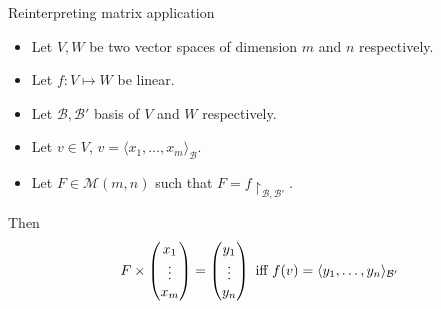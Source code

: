 \documentclass{beamer}
\begin{document}
\begin{frame}{Reinterpreting matrix application}
  \begin{itemize}
  \item Let $V, W$ be two vector spaces of dimension $m$ and $n$ respectively.
  \item Let $f: V \mapsto W$ be linear.
  \item Let $\mathcal{B}, \mathcal{B}'$ basis of $V$ and $W$ respectively.
  \item Let $v \in V$, $v = \langle x_1, \dots, x_m \rangle_{\mathcal{B}}$.
  \item Let $F \in \mathcal{M}(m, n)$ such that $F = f\restriction_{\mathcal{B}, \mathcal{B}'}$.
  \end{itemize}
  Then
  \[F \times \begin{pmatrix} x_1 \\ \vdots \\ x_m \end{pmatrix} = \begin{pmatrix} y_1 \\\vdots\\y_n \end{pmatrix} \textnormal{ iff } f(v) = \langle y_1, \dots, y_n \rangle_{\mathcal{B}'} \]
\end{frame}
\end{document}
